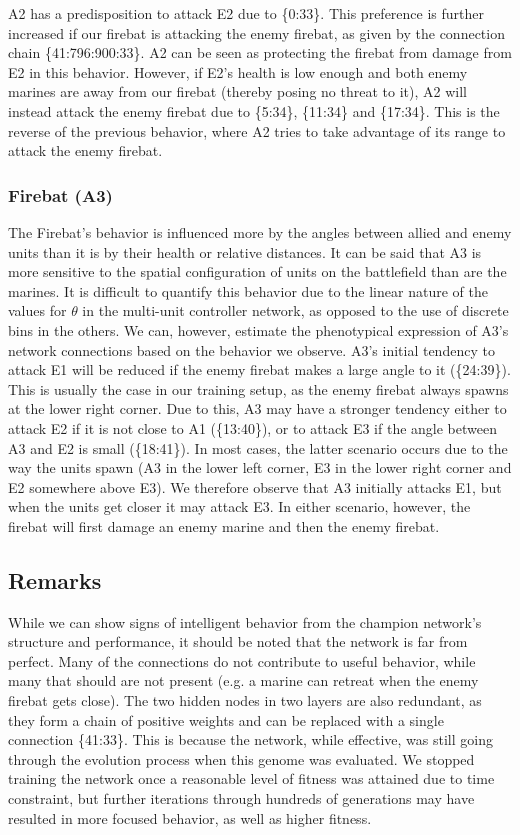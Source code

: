 \documentclass[10pt,a4paper,twocolumn]{article}
\begin{document}
A2 has a predisposition to attack E2 due to \{0:33\}. This preference is further increased if our firebat is attacking the enemy firebat, as given by the connection chain \{41:796:900:33\}. A2 can be seen as protecting the firebat from damage from E2 in this behavior. However, if E2's health is low enough and both enemy marines are away from our firebat (thereby posing no threat to it), A2 will instead attack the enemy firebat due to \{5:34\}, \{11:34\} and \{17:34\}. This is the reverse of the previous behavior, where A2 tries to take advantage of its range to attack the enemy firebat.

\subsubsection{Firebat (A3)}

The Firebat's behavior is influenced more by the angles between allied and enemy units than it is by their health or relative distances. It can be said that A3 is more sensitive to the spatial configuration of units on the battlefield than are the marines. It is difficult to quantify this behavior due to the linear nature of the values for $\theta$ in the multi-unit controller network, as opposed to the use of discrete bins in the others. We can, however, estimate the phenotypical expression of A3's network connections based on the behavior we observe. A3's initial tendency to attack E1 will be reduced if the enemy firebat makes a large angle to it (\{24:39\}). This is usually the case in our training setup, as the enemy firebat always spawns at the lower right corner. Due to this, A3 may have a stronger tendency either to attack E2 if it is not close to A1 (\{13:40\}), or to attack E3 if the angle between A3 and E2 is small (\{18:41\}). In most cases, the latter scenario occurs due to the way the units spawn (A3 in the lower left corner, E3 in the lower right corner and E2 somewhere above E3). We therefore observe that A3 initially attacks E1, but when the units get closer it may attack E3. In either scenario, however, the firebat will first damage an enemy marine and then the enemy firebat.

\subsection{Remarks}
\label{sec:network_remarks}

While we can show signs of intelligent behavior from the champion network's structure and performance, it should be noted that the network is far from perfect. Many of the connections do not contribute to useful behavior, while many that should are not present (e.g. a marine can retreat when the enemy firebat gets close). The two hidden nodes in two layers are also redundant, as they form a chain of positive weights and can be replaced with a single connection \{41:33\}. This is because the network, while effective, was still going through the evolution process when this genome was evaluated. We stopped training the network once a reasonable level of fitness was attained due to time constraint, but further iterations through hundreds of generations may have resulted in more focused behavior, as well as higher fitness.
\end{document}
